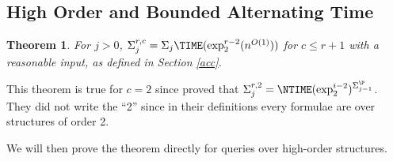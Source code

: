\documentclass[a4paper,12pt]{article}
\newtheorem{theorem}{Theorem}[section]
\theoremstyle{definition}
\newcommand{\ATIME}[2]{\ensuremath{\Sigma_{#2}\TIME(#1)}}
\newcommand{\hoc}[3]{\ensuremath{\Sigma^{#1,#3}_{#2}}}
\begin{document}
\subsection{High Order and Bounded Alternating Time}

\begin{theorem}\label{atimeorder} For $j>0$, 
  $\hoc{r}{j}{c}=\ATIME{\exp_2^{r-2}(n^{O(1)})}{j}$ for $c\le r+1$ with
  a reasonable input, as defined in Section \ref{acc}.
\end{theorem}

This theorem is true for $c=2$ since
\cite{lauri,kolo} proved that
$\hoc{r}{j}{2}=\NTIME(\exp_{2}^{i-2})^{\Sigma_{j-1}^{\P}}$. They did
not write the ``2'' since in their definitions every formulae are over
structures of order 2.

We will then prove the theorem directly for queries over high-order
structures.
\end{document}
